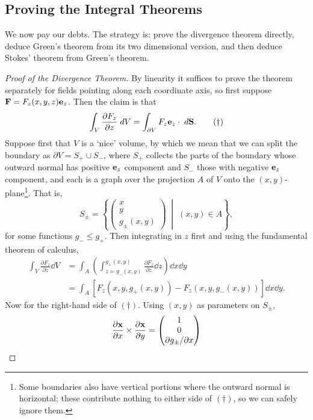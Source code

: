 \documentclass[a4paper]{scrartcl}
\begin{document}
\subsection{Proving the Integral Theorems}
\label{subsec:proofs}

We now pay our debts. The strategy is: prove the divergence theorem directly, deduce Green's theorem from its two dimensional version, and then deduce Stokes' theorem from Green's theorem.

\begin{proof}[Proof of the Divergence Theorem]
	By linearity it suffices to prove the theorem separately for fields pointing along each coordinate axis, so first suppose $\vv{F} = F_z(x, y, z) \vv{e}_z$. Then the claim is that
	\begin{equation}
	\int_V \frac{\partial F_z}{\partial z} \; d V = \int_{\partial V} F_z \mathbf{e}_z \cdot \; d \mathbf{S}. \tag{$\dagger$}
	\end{equation}
	Suppose first that $V$ is a `nice' volume, by which we mean that we can split the boundary as $\partial V = S_+ \cup S_-$, where $S_+$ collects the parts of the boundary whose outward normal has positive $\vv{e}_z$ component and $S_-$ those with negative $\vv{e}_z$ component, and each is a graph over the projection $A$ of $V$ onto the $(x, y)$-plane\footnote{Some boundaries also have vertical portions where the outward normal is horizontal; these contribute nothing to either side of $(\dagger)$, so we can safely ignore them.}. That is,
	$$
	S_{\pm} = \left\{\begin{pmatrix}
		x \\ y \\ g_{\pm}(x, y)
	\end{pmatrix} \;\middle|\; (x, y) \in A \right\},
	$$
	for some functions $g_- \leq g_+$. Then integrating in $z$ first and using the fundamental theorem of calculus,
	\begin{align*}
		\int_V \frac{\partial F_z}{\partial z} \dd V &= \int_A \left(\int_{z = g_-(x,y)}^{g_+(x, y)} \frac{\partial F_z}{\partial z} \dd z \right) \dd x \dd y \\
		&= \int_A \left[F_z(x, y, g_+(x, y)) - F_z(x, y, g_-(x, y))\right] \dd x \dd y.
	\end{align*}
	Now for the right-hand side of $(\dagger)$. Using $(x, y)$ as parameters on $S_\pm$,
	$$
	\frac{\partial \vv{x}}{\partial x} \times \frac{\partial \vv{x}}{\partial y} = \begin{pmatrix}
		1 \\ 0 \\ \partial g_\pm/\partial x

\end{pmatrix}$$
\end{proof}
\end{document}
